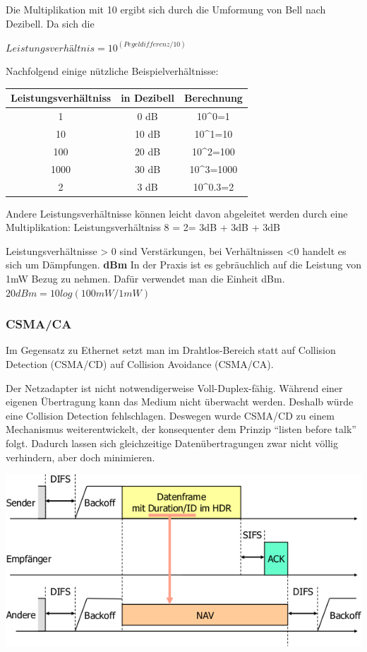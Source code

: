 Die Multiplikation mit 10 ergibt sich durch die Umformung von Bell nach Dezibell. Da sich die 

$Leistungsverhältnis = 10^(Pegeldifferenz/10)$

Nachfolgend einige nützliche Beispielverhältnisse:
\begin{tabular}{|c|c|c|}
\hline 
\textbf{Leistungsverhältniss} & \textbf{in Dezibell} & \textbf{Berechnung} \\ 
\hline 
1 & 0 dB & 10^0=1 \\ 
\hline 
10 & 10 dB & 10^1=10 \\ 
\hline 
100 & 20 dB & 10^2=100 \\ 
\hline 
1000 & 30 dB & 10^3=1000 \\ 
\hline 
2 & 3 dB & 10^0.3=2 \\ 
\hline 
\end{tabular} 
Andere Leistungsverhältnisse können leicht davon abgeleitet werden durch eine Multiplikation:
Leistungsverhältniss 8 = 2\cdot = 3dB + 3dB + 3dB

Leistungsverhältnisse > 0 sind Verstärkungen, bei Verhältnissen <0 handelt es sich um Dämpfungen.
\textbf{dBm}
In der Praxis ist es gebräuchlich auf die Leistung von 1mW Bezug zu nehmen. Dafür verwendet man die Einheit dBm. 
$20dBm = 10log(100mW/1mW)$



\subsubsection{CSMA/CA}

Im Gegensatz zu Ethernet setzt man im Drahtlos-Bereich statt auf Collision
Detection (CSMA/CD) auf Collision Avoidance (CSMA/CA).

Der Netzadapter ist nicht notwendigerweise Voll-Duplex-fähig. Während einer
eigenen Übertragung kann das Medium nicht überwacht werden. Deshalb würde eine
Collision Detection fehlschlagen. Deswegen wurde CSMA/CD zu einem Mechanismus
weiterentwickelt, der konsequenter dem Prinzip ``listen before talk'' folgt.
Dadurch lassen sich gleichzeitige Datenübertragungen zwar nicht völlig
verhindern, aber doch minimieren.

\begin{center}
	\includegraphics[width=.8\textwidth]{media/csma_ca.png}
\end{center}

